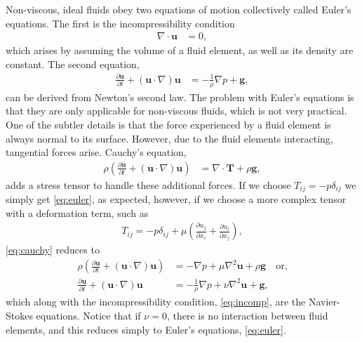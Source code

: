 \documentclass[10pt, titlepage]{article}
\begin{document}
Non-viscous, ideal fluids obey two equations of motion collectively called Euler's equations. The first is the incompressibility condition 
\begin{align}
\nabla \cdot \mathbf{u} &= 0,
\label{eq:incomp}
\end{align}
which arises by assuming the volume of a fluid element, as well as its density are constant. The second equation,
\begin{align}
\frac{\partial \mathbf{u}}{\partial t} + \left( \mathbf{u} \cdot \nabla \right) \mathbf{u} &= - \frac{1}{\rho} \nabla p + \mathbf{g}, \label{eq:euler}
\end{align}
can be derived from Newton's second law. The problem with Euler's equations is that they are only applicable for non-viscous fluids, which is not very practical. One of the subtler details is that the force experienced by a fluid element is always normal to its surface. However, due to the fluid elements interacting, tangential forces arise. Cauchy's equation,
\begin{align}
\rho \left( \frac{\partial \mathbf{u}}{\partial t} + \left( \mathbf{u} \cdot \nabla \right) \mathbf{u} \right) &= \nabla \cdot \mathbf{T} + \rho \mathbf{g},
\label{eq:cauchy}
\end{align}
adds a stress tensor to handle these additional forces. If we choose $T_{ij} = -p \delta_{ij}$ we simply get \eqref{eq:euler}, as expected, however, if we choose a more complex tensor with a deformation term, such as
\begin{align*}
T_{ij} = -p \delta_{ij} + \mu \left( \frac{\partial u_j}{\partial x_i} + \frac{\partial u_i}{\partial x_j} \right),
\end{align*}
\eqref{eq:cauchy} reduces to 
\begin{align}
\rho \left( \frac{\partial \mathbf{u}}{\partial t} + \left( \mathbf{u} \cdot \nabla \right) \mathbf{u} \right) &= - \nabla p + \mu \nabla^2 \mathbf{u} + \rho \mathbf{g} \quad \text{or,} \nonumber \\
\frac{\partial \mathbf{u}}{\partial t} + \left( \mathbf{u} \cdot \nabla \right) \mathbf{u} &= - \frac{1}{\rho} \nabla p + \nu \nabla^2 \mathbf{u} + \mathbf{g}, \label{eq:NSE}
\end{align}
which along with the incompressibility condition, \eqref{eq:incomp}, are the Navier-Stokes equations. Notice that if $\nu = 0$, there is no interaction between fluid elements, and this reduces simply to Euler's equations, \eqref{eq:euler}. 
\end{document}
